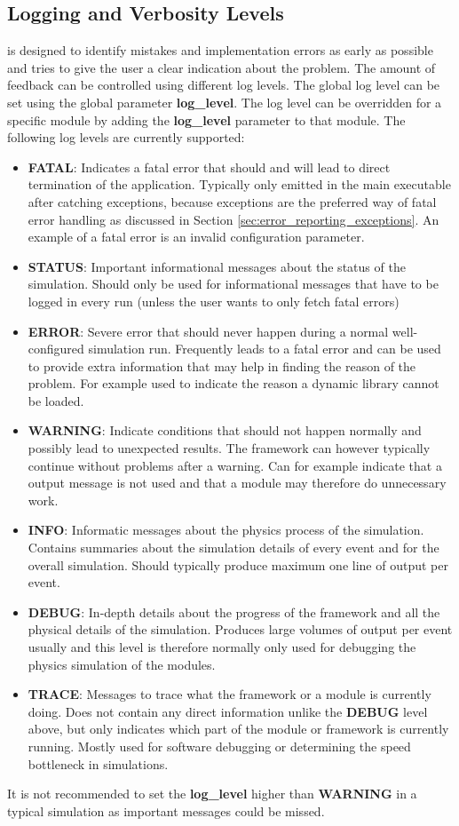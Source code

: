 \subsection{Logging and Verbosity Levels}
\label{sec:logging_verbosity}
\apsq is designed to identify mistakes and implementation errors as early as possible and tries to give the user a clear indication about the problem. The amount of feedback can be controlled using different log levels. The global log level can be set using the global parameter \textbf{log\_level}. The log level can be overridden for a specific module by adding the \textbf{log\_level} parameter to that module. The following log levels are currently supported:
\begin{itemize}
\item \textbf{FATAL}: Indicates a fatal error that should and will lead to direct termination of the application. Typically only emitted in the main executable after catching exceptions, because exceptions are the preferred way of fatal error handling as discussed in Section \ref{sec:error_reporting_exceptions}. An example of a fatal error is an invalid configuration parameter.
\item \textbf{STATUS}: Important informational messages about the status of the simulation. Should only be used for informational messages that have to be logged in every run (unless the user wants to only fetch fatal errors)
\item \textbf{ERROR}: Severe error that should never happen during a normal well-configured simulation run. Frequently leads to a fatal error and can be used to provide extra information that may help in finding the reason of the problem. For example used to indicate the reason a dynamic library cannot be loaded.
\item \textbf{WARNING}: Indicate conditions that should not happen normally and possibly lead to unexpected results. The framework can however typically continue without problems after a warning. Can for example indicate that a output message is not used and that a module may therefore do unnecessary work.
\item \textbf{INFO}: Informatic messages about the physics process of the simulation. Contains summaries about the simulation details of every event and for the overall simulation. Should typically produce maximum one line of output per event.
\item \textbf{DEBUG}: In-depth details about the progress of the framework and all the physical details of the simulation. Produces large volumes of output per event usually and this level is therefore normally only used for  debugging the physics simulation of the modules.
\item \textbf{TRACE}: Messages to trace what the framework or a module is currently doing. Does not contain any direct information unlike the \textbf{DEBUG} level above, but only indicates which part of the module or framework is currently running. Mostly used for software debugging or determining the speed bottleneck in simulations.
\end{itemize}
It is not recommended to set the \textbf{log\_level} higher than \textbf{WARNING} in a typical simulation as important messages could be missed.

